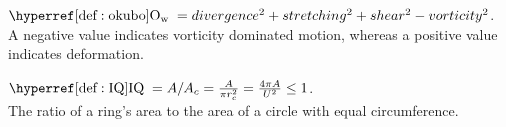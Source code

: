 \begin{multicols}{3}
\begin{definition}\label{def:okubo}
$\okubo=divergence^2+ stretching^2+ shear^2- vorticity^2$.\\
A negative value indicates vorticity dominated motion, whereas a positive value
indicates deformation.
\end{definition}

\begin{definition}\label{def:SSH}
 \end{definition}

\begin{definition}\label{def:IQ}
$\IQ=A/A_{c}=\frac{A}{\pi r^2_{c}}=\frac{4 \pi A}{U^2} \le 1$.\\
The ratio of a ring's area to the area of a circle with equal circumference.
 \end{definition}



\end{multicols}

